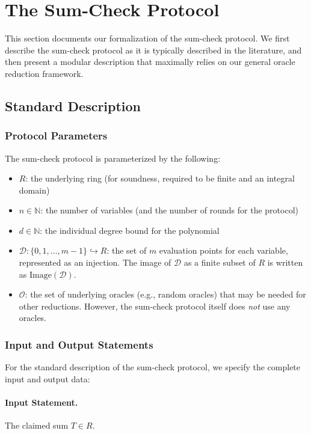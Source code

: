 \section{The Sum-Check Protocol}\label{sec:sumcheck}

This section documents our formalization of the sum-check protocol.
We first describe the sum-check protocol as it is typically described in the literature, and then
present a modular description that maximally relies on our general oracle reduction framework.

\subsection{Standard Description}\label{sec:sumcheck_standard}

\subsubsection{Protocol Parameters}

The sum-check protocol is parameterized by the following:
\begin{itemize}
    \item $R$: the underlying ring (for soundness, required to be finite and an integral domain)
    \item $n \in \mathbb{N}$: the number of variables (and the number of rounds for the protocol)
    \item $d \in \mathbb{N}$: the individual degree bound for the polynomial
    \item $\mathcal{D}: \{0, 1, \ldots, m-1\} \hookrightarrow R$: the set of $m$ evaluation points for each variable, represented as an injection. The image of $\mathcal{D}$ as a finite subset of $R$ is written as $\text{Image}(\mathcal{D})$.
    \item $\mathcal{O}$: the set of underlying oracles (e.g., random oracles) that may be needed for other reductions. However, the sum-check protocol itself does \emph{not} use any oracles.
\end{itemize}

\subsubsection{Input and Output Statements}

For the standard description of the sum-check protocol, we specify the complete input and output data:

\paragraph{Input Statement.} The claimed sum $T \in R$.

